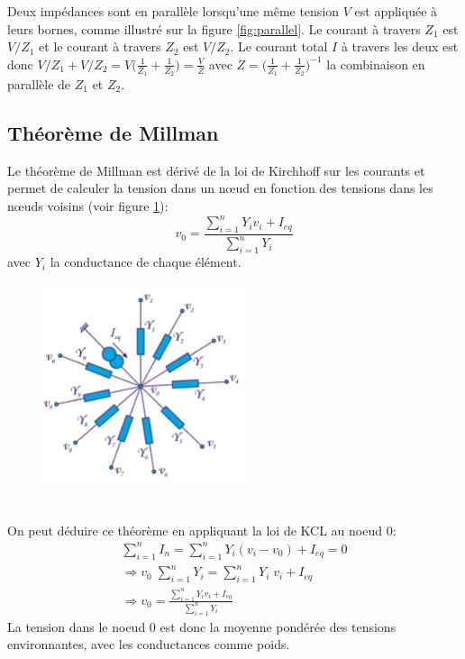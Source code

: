 Deux impédances sont en parallèle lorsqu'une même tension $V$ est appliquée à leurs bornes, comme illustré sur la figure \ref{fig:parallel}. Le courant à travers $Z_1$ est $V/Z_1$ et le courant à travers $Z_2$ est $V/Z_2$. Le courant total $I$ à travers les deux est donc $V/Z_1 + V/Z_2 = V \big(\frac{1}{Z_1} + \frac{1}{Z_2} \big) = \frac{V}{Z}$ avec $Z = \big(\frac{1}{Z_1} + \frac{1}{Z_2} \big)^{-1}$ la combinaison en parallèle de $Z_1$ et $Z_2$.

\subsection{Théorème de Millman}
Le théorème de Millman est dérivé de la loi de Kirchhoff sur les courants et permet de calculer la tension dans un nœud en fonction des tensions dans les nœuds voisins (voir figure \ref{fig:millman}):
\begin{equation}
	v_0 = \frac{\sum_{i=1}^n Y_i v_i + I_{eq}}{\sum_{i=1}^n Y_i}
	\label{eq:millman}
\end{equation}
avec $Y_i$ la conductance de chaque élément.
\begin{figure}[h!]
	\centering
	\includegraphics[width=6cm]{figures/ch00/millman.jpg}
	\caption{}
	\label{fig:millman}
\end{figure}
\\On peut déduire ce théorème en appliquant la loi de KCL au noeud $0$:
\begin{align*}
	\sum_{i = 1}^n I_n = \sum_{i = 1}^n Y_i(v_i - v_0) + I_{eq} = 0 \\
	\Rightarrow v_0 \; \sum_{i = 1}^n Y_i = \sum_{i = 1}^n Y_i\;v_i  + I_{eq} \\
	\Rightarrow v_0  = \frac{\sum_{i=1}^n Y_i v_i + I_{eq}}{\sum_{i=1}^n Y_i} 
\end{align*}
La tension dans le noeud $0$ est donc la moyenne pondérée des tensions environnantes, avec les conductances comme poids.

